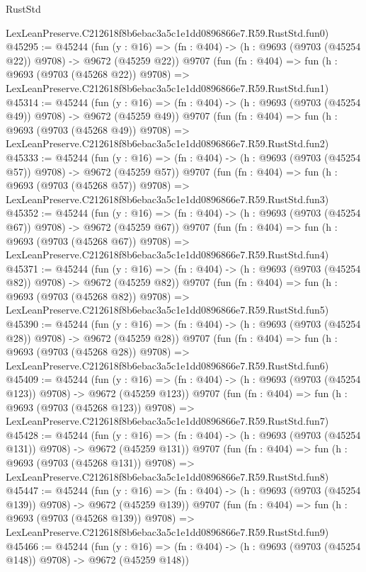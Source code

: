 \begin{lexlean}{RustStd}
\begin{coremodule}
    LexLeanPreserve.C212618f8b6ebac3a5c1e1dd0896866e7.R59.RustStd.fun0)
@45295 := @45244
    (fun (y : @16) => (fn : @404) -> (h : @9693 (@9703 (@45254 @22)) @9708) -> @9672 (@45259 @22))
    @9707
    (fun (fn : @404) =>
    fun (h : @9693 (@9703 (@45268 @22)) @9708) =>
    LexLeanPreserve.C212618f8b6ebac3a5c1e1dd0896866e7.R59.RustStd.fun1)
@45314 := @45244
    (fun (y : @16) => (fn : @404) -> (h : @9693 (@9703 (@45254 @49)) @9708) -> @9672 (@45259 @49))
    @9707
    (fun (fn : @404) =>
    fun (h : @9693 (@9703 (@45268 @49)) @9708) =>
    LexLeanPreserve.C212618f8b6ebac3a5c1e1dd0896866e7.R59.RustStd.fun2)
@45333 := @45244
    (fun (y : @16) => (fn : @404) -> (h : @9693 (@9703 (@45254 @57)) @9708) -> @9672 (@45259 @57))
    @9707
    (fun (fn : @404) =>
    fun (h : @9693 (@9703 (@45268 @57)) @9708) =>
    LexLeanPreserve.C212618f8b6ebac3a5c1e1dd0896866e7.R59.RustStd.fun3)
@45352 := @45244
    (fun (y : @16) => (fn : @404) -> (h : @9693 (@9703 (@45254 @67)) @9708) -> @9672 (@45259 @67))
    @9707
    (fun (fn : @404) =>
    fun (h : @9693 (@9703 (@45268 @67)) @9708) =>
    LexLeanPreserve.C212618f8b6ebac3a5c1e1dd0896866e7.R59.RustStd.fun4)
@45371 := @45244
    (fun (y : @16) => (fn : @404) -> (h : @9693 (@9703 (@45254 @82)) @9708) -> @9672 (@45259 @82))
    @9707
    (fun (fn : @404) =>
    fun (h : @9693 (@9703 (@45268 @82)) @9708) =>
    LexLeanPreserve.C212618f8b6ebac3a5c1e1dd0896866e7.R59.RustStd.fun5)
@45390 := @45244
    (fun (y : @16) => (fn : @404) -> (h : @9693 (@9703 (@45254 @28)) @9708) -> @9672 (@45259 @28))
    @9707
    (fun (fn : @404) =>
    fun (h : @9693 (@9703 (@45268 @28)) @9708) =>
    LexLeanPreserve.C212618f8b6ebac3a5c1e1dd0896866e7.R59.RustStd.fun6)
@45409 := @45244
    (fun (y : @16) => (fn : @404) -> (h : @9693 (@9703 (@45254 @123)) @9708) -> @9672 (@45259 @123))
    @9707
    (fun (fn : @404) =>
    fun (h : @9693 (@9703 (@45268 @123)) @9708) =>
    LexLeanPreserve.C212618f8b6ebac3a5c1e1dd0896866e7.R59.RustStd.fun7)
@45428 := @45244
    (fun (y : @16) => (fn : @404) -> (h : @9693 (@9703 (@45254 @131)) @9708) -> @9672 (@45259 @131))
    @9707
    (fun (fn : @404) =>
    fun (h : @9693 (@9703 (@45268 @131)) @9708) =>
    LexLeanPreserve.C212618f8b6ebac3a5c1e1dd0896866e7.R59.RustStd.fun8)
@45447 := @45244
    (fun (y : @16) => (fn : @404) -> (h : @9693 (@9703 (@45254 @139)) @9708) -> @9672 (@45259 @139))
    @9707
    (fun (fn : @404) =>
    fun (h : @9693 (@9703 (@45268 @139)) @9708) =>
    LexLeanPreserve.C212618f8b6ebac3a5c1e1dd0896866e7.R59.RustStd.fun9)
@45466 := @45244
    (fun (y : @16) => (fn : @404) -> (h : @9693 (@9703 (@45254 @148)) @9708) -> @9672 (@45259 @148))

\end{coremodule}
\end{lexlean}
